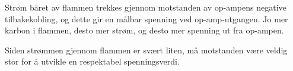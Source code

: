 
Strøm båret av flammen trekkes gjennom motstanden av op-ampens negative tilbakekobling, og dette gir en målbar spenning ved op-amp-utgangen. Jo mer karbon i flammen, desto mer strøm, og desto mer spenning ut fra op-ampen.

\vskip 10pt

Siden strømmen gjennom flammen er svært liten, må motstanden være veldig stor for å utvikle en respektabel spenningsverdi.









